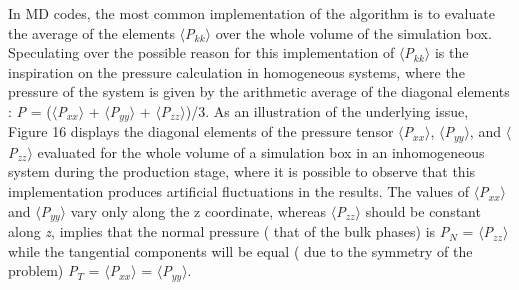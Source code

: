 \documentclass{scrbook}
\begin{document}
In MD codes, the most common implementation of the algorithm is to evaluate the
average of the elements ${\langle}$\textit{P}$_{kk}$${\rangle}$ over the whole
volume of the simulation box. Speculating over the possible reason for this
implementation of ${\langle}$\textit{P}$_{kk}$${\rangle}$ is the inspiration on
the pressure calculation in homogeneous systems, where the pressure of the
system is given by the arithmetic average of the diagonal elements : \textit{P}
= (${\langle}$\textit{P}$_{xx}$${\rangle}$
+ ${\langle}$\textit{P}$_{yy}$${\rangle}$
+ ${\langle}$\textit{P}$_{zz}$${\rangle}$)/3. As an illustration of the
underlying issue, Figure 16 displays the diagonal elements of the pressure
tensor ${\langle}$\textit{P}$_{xx}$${\rangle}$,
${\langle}$\textit{P}$_{yy}$${\rangle}$, and
${\langle}$\textit{P}$_{zz}$${\rangle}$ evaluated for the whole volume of
a simulation box in an inhomogeneous system during the production stage, where
it is possible to observe that this implementation produces artificial
fluctuations in the results.  The values of
${\langle}$\textit{P}$_{xx}$${\rangle}$ and
${\langle}$\textit{P}$_{yy}$${\rangle}$ vary only along the z coordinate,
whereas ${\langle}$\textit{P}$_{zz}$${\rangle}$ should be constant along
\textit{z},  implies that the normal pressure ( that of the bulk phases) is
\textit{P}$_{N}$ = ${\langle}$\textit{P}$_{zz}$${\rangle}$ while the tangential
components will be equal ( due to the symmetry of the problem)
\textit{P}$_{T}$ = ${\langle}$\textit{P}$_{xx}$${\rangle}$
= ${\langle}$\textit{P}$_{yy}$${\rangle}$. 
\end{document}

